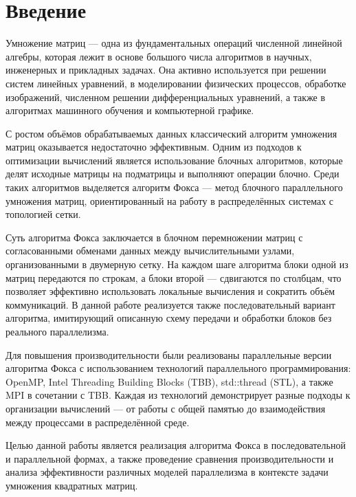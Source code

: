 \documentclass[12pt,a4paper]{extarticle}
\begin{document}
	\newpage

\tableofcontents
\newpage

\clearpage
{}
\section*{Введение}
Умножение матриц — одна из фундаментальных операций численной линейной алгебры, которая лежит в основе большого числа алгоритмов в научных, инженерных и прикладных задачах. Она активно используется при решении систем линейных уравнений, в моделировании физических процессов, обработке изображений, численном решении дифференциальных уравнений, а также в алгоритмах машинного обучения и компьютерной графике.

С ростом объёмов обрабатываемых данных классический алгоритм умножения матриц оказывается недостаточно эффективным. Одним из подходов к оптимизации вычислений является использование блочных алгоритмов, которые делят исходные матрицы на подматрицы и выполняют операции блочно. Среди таких алгоритмов выделяется алгоритм Фокса — метод блочного параллельного умножения матриц, ориентированный на работу в распределённых системах с топологией сетки.

Суть алгоритма Фокса заключается в блочном перемножении матриц с согласованными обменами данных между вычислительными узлами, организованными в двумерную сетку. На каждом шаге алгоритма блоки одной из матриц передаются по строкам, а блоки второй — сдвигаются по столбцам, что позволяет эффективно использовать локальные вычисления и сократить объём коммуникаций. В данной работе реализуется также последовательный вариант алгоритма, имитирующий описанную схему передачи и обработки блоков без реального параллелизма.

Для повышения производительности были реализованы параллельные версии алгоритма Фокса с использованием технологий параллельного программирования: OpenMP, Intel Threading Building Blocks (TBB), std::thread (STL), а также MPI в сочетании с TBB. Каждая из технологий демонстрирует разные подходы к организации вычислений — от работы с общей памятью до взаимодействия между процессами в распределённой среде.

Целью данной работы является реализация алгоритма Фокса в последовательной и параллельной формах, а также проведение сравнения производительности и анализа эффективности различных моделей параллелизма в контексте задачи умножения квадратных матриц.
\end{document}

